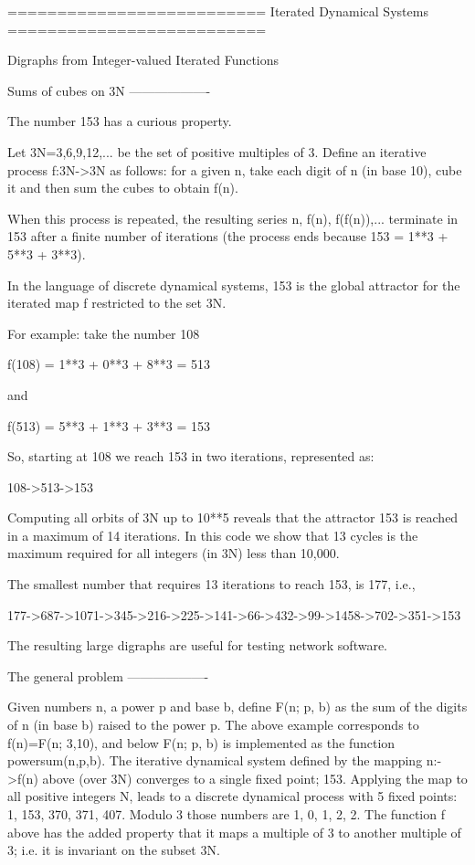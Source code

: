 \begin{DoxyVerb}==========================
Iterated Dynamical Systems
==========================

Digraphs from Integer-valued Iterated Functions

Sums of cubes on 3N
-------------------

The number 153 has a curious property.

Let 3N={3,6,9,12,...} be the set of positive multiples of 3.  Define an
iterative process f:3N->3N as follows: for a given n, take each digit
of n (in base 10), cube it and then sum the cubes to obtain f(n).

When this process is repeated, the resulting series n, f(n), f(f(n)),...
terminate in 153 after a finite number of iterations (the process ends
because 153 = 1**3 + 5**3 + 3**3).

In the language of discrete dynamical systems, 153 is the global
attractor for the iterated map f restricted to the set 3N.

For example: take the number 108

f(108) = 1**3 + 0**3 + 8**3 = 513

and

f(513) = 5**3 + 1**3 + 3**3 = 153

So, starting at 108 we reach 153 in two iterations,
represented as:

108->513->153

Computing all orbits of 3N up to 10**5 reveals that the attractor
153 is reached in a maximum of 14 iterations. In this code we
show that 13 cycles is the maximum required for all integers (in 3N)
less than 10,000.

The smallest number that requires 13 iterations to reach 153, is 177, i.e.,

177->687->1071->345->216->225->141->66->432->99->1458->702->351->153

The resulting large digraphs are useful for testing network software.

The general problem
-------------------

Given numbers n, a power p and base b, define F(n; p, b) as the sum of
the digits of n (in base b) raised to the power p. The above example
corresponds to f(n)=F(n; 3,10), and below F(n; p, b) is implemented as
the function powersum(n,p,b). The iterative dynamical system defined by
the mapping n:->f(n) above (over 3N) converges to a single fixed point;
153. Applying the map to all positive integers N, leads to a discrete
dynamical process with 5 fixed points: 1, 153, 370, 371, 407. Modulo 3
those numbers are 1, 0, 1, 2, 2. The function f above has the added
property that it maps a multiple of 3 to another multiple of 3; i.e. it
is invariant on the subset 3N.



\end{DoxyVerb}
